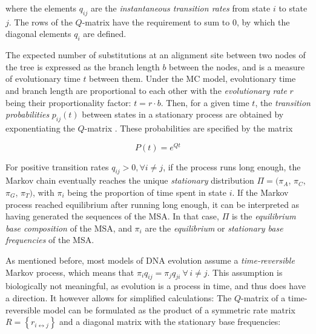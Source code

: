where the elements $q_{ij}$ are the \emph{instantaneous transition rates} from state $i$ to state $j$.
The rows of the $Q$-matrix have the requirement to sum to $0$,
by which the diagonal elements $q_{i}$ are defined.

The expected number of substitutions at an alignment site between two nodes of the tree
is expressed as the branch length $b$ between the nodes, and is a measure of evolutionary time $t$ between them.
Under the MC model, evolutionary time and branch length are proportional to each other
with the \emph{evolutionary rate} $r$ being their proportionality factor: $t = r \cdot b$.
Then, for a given time $t$, the \emph{transition probabilities} $p_{ij}(t)$ between states in a stationary process
are obtained by exponentiating the $Q$-matrix \cite{Yang2014}.
These probabilities are specified by the matrix

\begin{equation}
    \label{ch:Foundations:sec:MLTreeInference:eq:P_matrix}
    P(t) = e^{Qt}
\end{equation}

For positive transition rates $q_{ij} > 0, \forall i \neq j$, if the process runs long enough,
the Markov chain eventually reaches the unique \emph{stationary} distribution $\Pi = (\pi_A$, $\pi_C$, $\pi_G$, $\pi_T )$,
with $\pi_i$ being the proportion of time spent in state $i$.
If the Markov process reached equilibrium after running long enough,
it can be interpreted as having generated the sequences of the MSA.
In that case, $\Pi$ is the \emph{equilibrium base composition} of the MSA,
and $\pi_i$ are the \emph{equilibrium} or \emph{stationary base frequencies} of the MSA.

As mentioned before, most models of DNA evolution assume a \emph{time-reversible} Markov process,
which means that $\pi_{i} q_{ij} = \pi_{j} q_{ji} ~ \forall \, i \neq j$.
This assumption is biologically not meaningful, as evolution is a process in time, and thus does have a direction.
It however allows for simplified calculations:
The $Q$-matrix of a time-reversible model can be formulated as the product of
a symmetric rate matrix $R = \left\{ r_{i \leftrightarrow j} \right\}$ and
a diagonal matrix with the stationary base frequencies:

